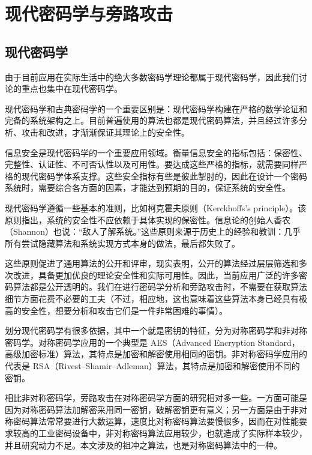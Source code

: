 
\chapter{现代密码学与旁路攻击}

\section{现代密码学} %

由于目前应用在实际生活中的绝大多数密码学理论都属于现代密码学，因此我们讨论的重点也集中在现代密码学。

现代密码学和古典密码学的一个重要区别是：现代密码学构建在严格的数学论证和完备的系统架构之上。目前普遍使用的算法也都是现代密码算法，并且经过许多分析、攻击和改进，才渐渐保证其理论上的安全性。 \cite{cryptography_foundations}

信息安全是现代密码学的一个重要应用领域。衡量信息安全的指标包括：保密性、完整性、认证性、不可否认性以及可用性。要达成这些严格的指标，就需要同样严格的现代密码学体系支撑。这些安全指标有些是彼此掣肘的，因此在设计一个密码系统时，需要综合各方面的因素，才能达到预期的目的，保证系统的安全性。

现代密码学遵循一些基本的准则，比如柯克霍夫原则（Kerckhoffs's principle）。该原则指出，系统的安全性不应依赖于具体实现的保密性。信息论的创始人香农（Shannon）也说：“敌人了解系统。”这些原则来源于历史上的经验和教训：几乎所有尝试隐藏算法和系统实现方式本身的做法，最后都失败了。

这些原则促进了通用算法的公开和评审，现实表明，公开的算法经过层层筛选和多次改进，具备更加优良的理论安全性和实际可用性。因此，当前应用广泛的许多密码算法都是公开透明的。我们在进行密码学分析和旁路攻击时，不需要在获取算法细节方面花费不必要的工夫（不过，相应地，这也意味着这些算法本身已经具有极高的安全性，想要分析和攻击它们是一件非常困难的事情）。 \cite{cryptography_basic}

划分现代密码学有很多依据，其中一个就是密钥的特征，分为对称密码学和非对称密码学。对称密码学应用的一个典型是 AES（Advanced Encryption Standard，高级加密标准）算法，其特点是加密和解密使用相同的密钥。非对称密码学应用的代表是 RSA（Rivest–Shamir–Adleman）算法，其特点是加密和解密使用不同的密钥。\cite{modern_cryptography}

相比非对称密码学，旁路攻击在对称密码学方面的研究相对多一些。一方面可能是因为对称密码算法加解密采用同一密钥，破解密钥更有意义；另一方面是由于非对称密码算法常常要进行大数运算，速度比对称密码算法要慢很多，因而在对性能要求较高的工业密码设备中，非对称密码算法应用较少，也就造成了实际样本较少，并且研究动力不足。本文涉及的祖冲之算法，也是对称密码算法中的一种。

